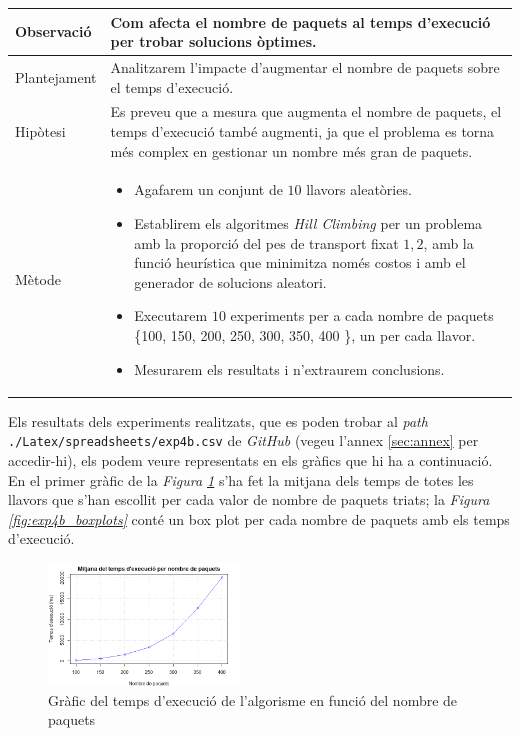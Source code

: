 \documentclass[a4paper]{article}
\begin{document}
	\begin{table}[ht]
		\centering
		\begin{tabular}{|l|p{10cm}|}
			\hline
			Observació & Com afecta el nombre de paquets al temps d'execució per trobar solucions òptimes. \\
			\hline
			Plantejament & Analitzarem l'impacte d'augmentar el nombre de paquets sobre el temps d'execució.\\
			\hline
			Hipòtesi & Es preveu que a mesura que augmenta el nombre de paquets, el temps d'execució també augmenti, ja que el problema es torna més complex en gestionar un nombre més gran de paquets.\\
			\hline
			Mètode &
			\begin{itemize}
				\item Agafarem un conjunt de $10$ llavors aleatòries.
				\item Establirem els algoritmes \textit{Hill Climbing} per un problema amb la proporció del pes de transport fixat  $1,2$, amb la funció heurística que minimitza només costos i amb el generador de solucions aleatori.
				\item Executarem $10$ experiments per a cada nombre de paquets \{100, 150, 200, 250, 300, 350, 400 \}, un per cada llavor.
				\item Mesurarem els resultats i n'extraurem conclusions.
			\end{itemize} \\
			\hline
		\end{tabular}
		\label{tab:exp4b_apartats}
	\end{table}
	
	Els resultats dels experiments realitzats, que es poden trobar al \textit{path} \texttt{./Latex/spreadsheets/exp4b.csv} de \textit{GitHub} (vegeu l'annex \ref{sec:annex} per accedir-hi), els podem veure representats en els gràfics que hi ha a continuació. En el primer gràfic de la \textit{Figura \ref{fig:exp4b_grafic_lineal2}} s'ha fet la mitjana dels temps de totes les llavors que s'han escollit per cada valor de nombre de paquets triats; la \textit{Figura \ref{fig:exp4b_boxplots}} conté un box plot per cada nombre de paquets amb els temps d'execució.\\

	\begin{figure}[H]
		\centering
		\includegraphics[width=0.45\textwidth]{images/exp4b_grafic_lineal2.png}
		\caption{Gràfic del temps d'execució de l'algorisme en funció del nombre de paquets}
		\label{fig:exp4b_grafic_lineal2}
	\end{figure}
	
\end{document}
